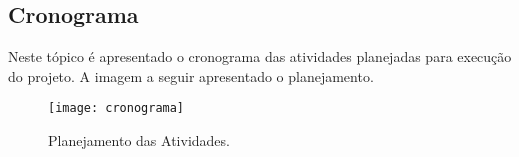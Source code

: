 \begin{landscape}
\chapter[Cronograma]{Cronograma}
\label{chap:cronograma}
	
	Neste tópico é apresentado o cronograma das atividades planejadas para execução do projeto. A imagem a seguir apresentado o planejamento.

	\begin{figure}[h]
		\centering
		\texttt{[image: cronograma]}
		\caption{Planejamento das Atividades.}
		\label{fig:cronograma}
	\end{figure}


\end{landscape}
